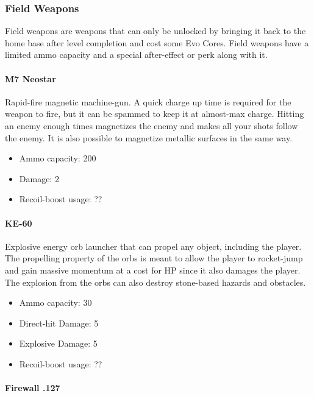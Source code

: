 \documentclass[12pt]{article}
\begin{document}
\subsubsection{Field Weapons}

Field weapons are weapons that can only be unlocked by bringing it back to the home base after level completion and cost some Evo Cores. Field weapons have a limited ammo capacity and a special after-effect or perk along with it.

\paragraph{M7 Neostar}

Rapid-fire magnetic machine-gun. A quick charge up time is required for the weapon to fire, but it can be spammed to keep it at almost-max charge. Hitting an enemy enough times magnetizes the enemy and makes all your shots follow the enemy. It is also possible to magnetize metallic surfaces in the same way.

\begin{itemize}
	\item Ammo capacity: 200
	\item Damage: 2
	\item Recoil-boost usage: ??
\end{itemize}


\paragraph{KE-60}

Explosive energy orb launcher that can propel any object, including the player. The propelling property of the orbs is meant to allow the player to rocket-jump and gain massive momentum at a cost for HP since it also damages the player. The explosion from the orbs can also destroy stone-based hazards and obstacles. 

\begin{itemize}
	\item Ammo capacity: 30
	\item Direct-hit Damage: 5
	\item Explosive Damage: 5
	\item Recoil-boost usage: ??
\end{itemize} 


\paragraph{Firewall .127}
\end{document}
